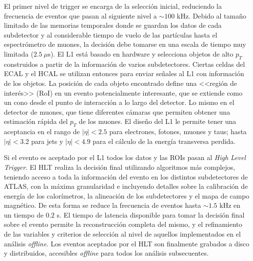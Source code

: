 El primer nivel de trigger se encarga de la selección inicial, reduciendo la frecuencia de eventos que pasan al siguiente nivel a $\sim100$ kHz. Debido al tamaño limitado de las memorias temporales donde se guardan los datos de cada subdetector y al considerable tiempo de vuelo de las partículas hasta el espectrómetro de muones, la decisión debe tomarse en una escala de tiempo muy limitada ($2.5 \:\mu$s). El L1 está basado en hardware y selecciona objetos de alto $p_{T}$ construidos a partir de la información de varios subdetectores. Ciertas celdas del ECAL y el HCAL se utilizan entonces para enviar señales al L1 con información de los objetos. La posición de cada objeto encontrado define una <<región de interés>> (RoI) en un evento potencialmente interesante, que se extiende como un
cono desde el punto de interacción a lo largo del detector. Lo mismo en el detector de muones, que tiene diferentes cámaras que permiten obtener una estimación rápida del $p_{T}$ de los muones. El diseño del L1 le permite tener una aceptancia en el rango de $|\eta|<2.5$ para electrones, fotones, muones y taus; hasta $|\eta|<3.2$ para jets y $|\eta|<4.9$ para el cálculo de la energía transversa perdida.


Si el evento es aceptado por el L1 todos los datos y las ROIs pasan al \textit{High Level Trigger}. El HLT realiza la decisión final utilizando algoritmos más complejos, teniendo acceso a toda la información del evento en los distintos subdetectores de ATLAS, con la máxima granularidad e incluyendo detalles sobre la calibración de energía de los calorímetros, la alineación de los subdetectores y el mapa de campo magnético. De esta forma se reduce la frecuencia de eventos hasta  $\sim 1.5$ kHz en un tiempo de $0.2$ s. El tiempo de latencia disponible para tomar la decisión final sobre el evento permite la reconstrucción completa del mismo, y el refinamiento de las variables y criterios de selección al nivel de aquellos implementados en el análisis \textit{offline}. Los eventos aceptados por el HLT son finalmente grabados a disco y distribuidos, accesibles \textit{offline} para todos los análisis subsecuentes.

